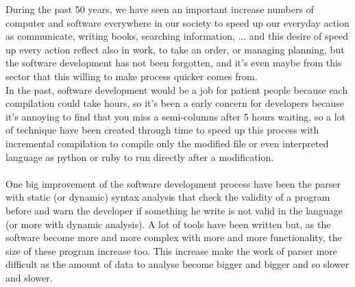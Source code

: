 During the past 50 years, we have seen an important increase numbers of computer and software everywhere in our society to speed up our everyday action as communicate, writing books, searching information, ... and this desire of speed up every action reflect also in work, to take an order, or managing planning, but the software development has not been forgotten, and it's even maybe from this sector that this willing to make process quicker comes from.
\\
In the past, software development would be a job for patient people because each compilation could take hours, so it's been a early concern for developers because it's annoying to find that you miss a semi-columns after 5 hours waiting, so a lot of technique have been created through time to speed up this process with incremental compilation to compile only the modified file or even interpreted language as python or ruby to run directly after a modification.
\\
\\
One big improvement of the software development process have been the parser with static (or dynamic) syntax analysis that check the validity of a program before and warn the developer if something he write is not valid in the language (or more with dynamic analysis). A lot of tools have been written but, as the software become more and more complex with more and more functionality, the size of these program increase too. This increase make the work of parser more difficult as the amount of data to analyse become bigger and bigger and so slower and slower.
\\

